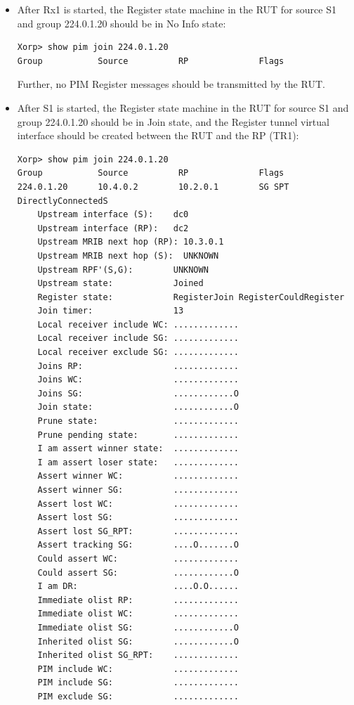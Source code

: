 \documentclass[11pt]{report}
\begin{document}
\begin{itemize}

  \item After Rx1 is started, the Register state machine in the RUT for source
  S1 and group 224.0.1.20 should be in No Info state:

\begin{verbatim}
Xorp> show pim join 224.0.1.20
Group           Source          RP              Flags
\end{verbatim}

  Further, no PIM Register messages should be transmitted by the RUT.

  \item After S1 is started, the Register state machine in the RUT for source
  S1 and group 224.0.1.20 should be in Join state, and the Register tunnel
  virtual interface should be created between the RUT and the RP (TR1):

\begin{verbatim}
Xorp> show pim join 224.0.1.20
Group           Source          RP              Flags
224.0.1.20      10.4.0.2        10.2.0.1        SG SPT DirectlyConnectedS 
    Upstream interface (S):    dc0
    Upstream interface (RP):   dc2
    Upstream MRIB next hop (RP): 10.3.0.1
    Upstream MRIB next hop (S):  UNKNOWN
    Upstream RPF'(S,G):        UNKNOWN
    Upstream state:            Joined 
    Register state:            RegisterJoin RegisterCouldRegister 
    Join timer:                13
    Local receiver include WC: .............
    Local receiver include SG: .............
    Local receiver exclude SG: .............
    Joins RP:                  .............
    Joins WC:                  .............
    Joins SG:                  ............O
    Join state:                ............O
    Prune state:               .............
    Prune pending state:       .............
    I am assert winner state:  .............
    I am assert loser state:   .............
    Assert winner WC:          .............
    Assert winner SG:          .............
    Assert lost WC:            .............
    Assert lost SG:            .............
    Assert lost SG_RPT:        .............
    Assert tracking SG:        ....O.......O
    Could assert WC:           .............
    Could assert SG:           ............O
    I am DR:                   ....O.O......
    Immediate olist RP:        .............
    Immediate olist WC:        .............
    Immediate olist SG:        ............O
    Inherited olist SG:        ............O
    Inherited olist SG_RPT:    .............
    PIM include WC:            .............
    PIM include SG:            .............
    PIM exclude SG:            .............
\end{verbatim}


\end{itemize}
\end{document}
